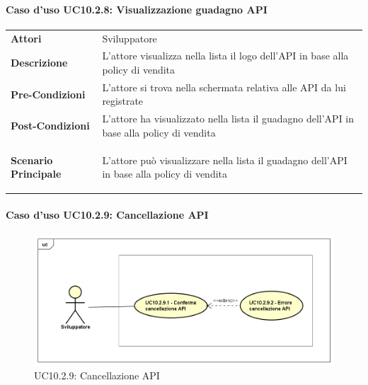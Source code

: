 \paragraph{Caso d'uso UC10.2.8: Visualizzazione guadagno API}
\label{UC10_2_8}

\begin{minipage}{\linewidth}
	\begin{tabular}{ l | p{11cm}}
		\hline
		\rowcolor{Gray}
		\multicolumn{2}{c}{UC10.2.8 - Visualizzazione guadagno API} \\
		\hline
		\textbf{Attori} & Sviluppatore \\
		\textbf{Descrizione} & L'attore visualizza nella lista il logo dell'API in base alla policy di vendita \\
		\textbf{Pre-Condizioni} & L'attore si trova nella schermata relativa alle API da lui registrate \\
		\textbf{Post-Condizioni} & L'attore ha visualizzato nella lista il guadagno dell'API in base alla policy di vendita \\
		\textbf{Scenario Principale} & 
		\begin{enumerate*}[label=(\arabic*.),itemjoin={\newline}]
			\item L'attore può visualizzare nella lista il guadagno dell'API in base alla policy di vendita
		\end{enumerate*}\\
	\end{tabular}
\end{minipage}

\newpage
\paragraph{Caso d'uso UC10.2.9: Cancellazione API}
\label{UC10_2_9}
\begin{figure}[ht]
	\centering
	\includegraphics[scale=0.45]{UML/UC10_2_9.png}
	\caption{UC10.2.9: Cancellazione API}
\end{figure}

